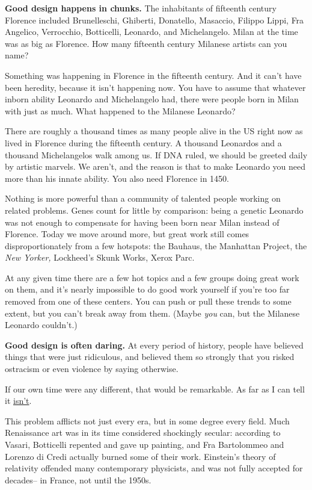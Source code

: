 \documentclass[12pt]{book}
\begin{document}
\textbf{Good design happens in chunks.} The inhabitants of fifteenth
century Florence included Brunelleschi, Ghiberti, Donatello, Masaccio,
Filippo Lippi, Fra Angelico, Verrocchio, Botticelli, Leonardo, and
Michelangelo. Milan at the time was as big as Florence. How many
fifteenth century Milanese artists can you name?

Something was happening in Florence in the fifteenth century. And it
can't have been heredity, because it isn't happening now. You have to
assume that whatever inborn ability Leonardo and Michelangelo had, there
were people born in Milan with just as much. What happened to the
Milanese Leonardo?

There are roughly a thousand times as many people alive in the US right
now as lived in Florence during the fifteenth century. A thousand
Leonardos and a thousand Michelangelos walk among us. If DNA ruled, we
should be greeted daily by artistic marvels. We aren't, and the reason
is that to make Leonardo you need more than his innate ability. You also
need Florence in 1450.

Nothing is more powerful than a community of talented people working on
related problems. Genes count for little by comparison: being a genetic
Leonardo was not enough to compensate for having been born near Milan
instead of Florence. Today we move around more, but great work still
comes disproportionately from a few hotspots: the Bauhaus, the Manhattan
Project, the \emph{New Yorker,} Lockheed's Skunk Works, Xerox Parc.

At any given time there are a few hot topics and a few groups doing
great work on them, and it's nearly impossible to do good work yourself
if you're too far removed from one of these centers. You can push or
pull these trends to some extent, but you can't break away from them.
(Maybe \emph{you} can, but the Milanese Leonardo couldn't.)

\textbf{Good design is often daring.} At every period of history, people
have believed things that were just ridiculous, and believed them so
strongly that you risked ostracism or even violence by saying otherwise.

If our own time were any different, that would be remarkable. As far as
I can tell it \href{say.html}{isn't}.

This problem afflicts not just every era, but in some degree every
field. Much Renaissance art was in its time considered shockingly
secular: according to Vasari, Botticelli repented and gave up painting,
and Fra Bartolommeo and Lorenzo di Credi actually burned some of their
work. Einstein's theory of relativity offended many contemporary
physicists, and was not fully accepted for decades-- in France, not
until the 1950s.
\end{document}
